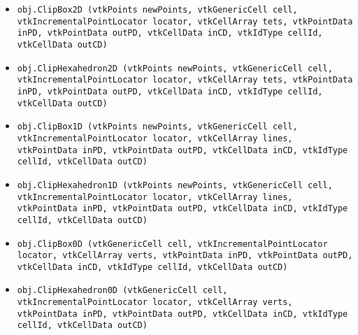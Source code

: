 \begin{itemize}
\item  \verb|obj.ClipBox2D (vtkPoints newPoints, vtkGenericCell cell, vtkIncrementalPointLocator locator, vtkCellArray tets, vtkPointData inPD, vtkPointData outPD, vtkCellData inCD, vtkIdType cellId, vtkCellData outCD)|

\item  \verb|obj.ClipHexahedron2D (vtkPoints newPoints, vtkGenericCell cell, vtkIncrementalPointLocator locator, vtkCellArray tets, vtkPointData inPD, vtkPointData outPD, vtkCellData inCD, vtkIdType cellId, vtkCellData outCD)|

\item  \verb|obj.ClipBox1D (vtkPoints newPoints, vtkGenericCell cell, vtkIncrementalPointLocator locator, vtkCellArray lines, vtkPointData inPD, vtkPointData outPD, vtkCellData inCD, vtkIdType cellId, vtkCellData outCD)|

\item  \verb|obj.ClipHexahedron1D (vtkPoints newPoints, vtkGenericCell cell, vtkIncrementalPointLocator locator, vtkCellArray lines, vtkPointData inPD, vtkPointData outPD, vtkCellData inCD, vtkIdType cellId, vtkCellData outCD)|

\item  \verb|obj.ClipBox0D (vtkGenericCell cell, vtkIncrementalPointLocator locator, vtkCellArray verts, vtkPointData inPD, vtkPointData outPD, vtkCellData inCD, vtkIdType cellId, vtkCellData outCD)|

\item  \verb|obj.ClipHexahedron0D (vtkGenericCell cell, vtkIncrementalPointLocator locator, vtkCellArray verts, vtkPointData inPD, vtkPointData outPD, vtkCellData inCD, vtkIdType cellId, vtkCellData outCD)|

\end{itemize}
